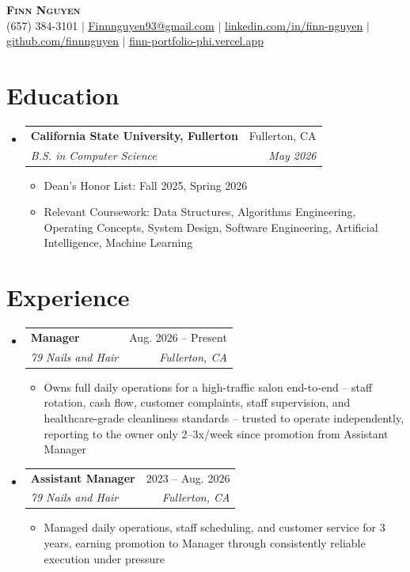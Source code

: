 \documentclass[letterpaper,11pt]{article}
\makeatletter
\newcommand{\resumeItem}[1]{
  \item\small{
    {#1 \vspace{-2pt}}
  }
}
\newcommand{\resumeSubheading}[4]{
  \vspace{-2pt}\item
    \begin{tabular*}{0.97\textwidth}[t]{l@{\extracolsep{\fill}}r}
      \textbf{#1} & #2 \\
      \textit{\small#3} & \textit{\small #4} \\
    \end{tabular*}\vspace{-7pt}
}
\newcommand{\resumeSubHeadingListStart}{\begin{itemize}[leftmargin=0.15in, label={}]}
\newcommand{\resumeSubHeadingListEnd}{\end{itemize}}
\newcommand{\resumeItemListStart}{\begin{itemize}}
\newcommand{\resumeItemListEnd}{\end{itemize}\vspace{-5pt}}
\makeatother
\begin{document}
\begin{center}
    \textbf{\Huge \scshape Finn Nguyen} \\ \vspace{1pt}
    \small (657) 384-3101 $|$ \href{mailto:Finnnguyen93@gmail.com}{\underline{Finnnguyen93@gmail.com}} $|$
    \href{https://linkedin.com/in/finn-nguyen}{\underline{linkedin.com/in/finn-nguyen}} $|$
    \href{https://github.com/finnnguyen}{\underline{github.com/finnnguyen}} $|$
    \href{https://finn-portfolio-phi.vercel.app/}{\underline{finn-portfolio-phi.vercel.app}}
\end{center}


\section{Education}
  \resumeSubHeadingListStart
    \resumeSubheading
      {California State University, Fullerton}{Fullerton, CA}
      {B.S. in Computer Science}{May 2026}
      \resumeItemListStart
        \resumeItem{Dean's Honor List: Fall 2025, Spring 2026}
        \resumeItem{Relevant Coursework: Data Structures, Algorithms Engineering, Operating Concepts, System Design, Software Engineering, Artificial Intelligence, Machine Learning}
      \resumeItemListEnd
  \resumeSubHeadingListEnd


\section{Experience}
  \resumeSubHeadingListStart

    \resumeSubheading
      {Manager}{Aug. 2026 -- Present}
      {79 Nails and Hair}{Fullerton, CA}
      \resumeItemListStart
        \resumeItem{Owns full daily operations for a high-traffic salon end-to-end -- staff rotation, cash flow, customer complaints, staff supervision, and healthcare-grade cleanliness standards -- trusted to operate independently, reporting to the owner only 2--3x/week since promotion from Assistant Manager}
      \resumeItemListEnd

    \resumeSubheading
      {Assistant Manager}{2023 -- Aug. 2026}
      {79 Nails and Hair}{Fullerton, CA}
      \resumeItemListStart
        \resumeItem{Managed daily operations, staff scheduling, and customer service for 3 years, earning promotion to Manager through consistently reliable execution under pressure}
      \resumeItemListEnd

  \resumeSubHeadingListEnd
\end{document}
